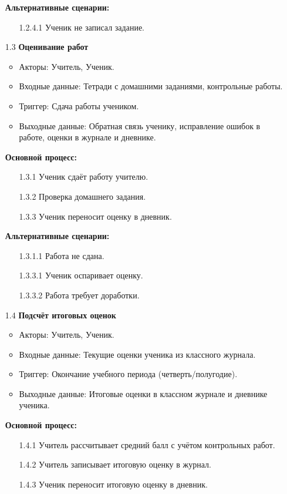 \documentclass[a4paper, final]{article}
\begin{document}
\begin{enumerate}
  \textbf{Альтернативные сценарии:}
  \begin{itemize}
    \item[1.2.4.1] Ученик не записал задание.
  \end{itemize}

  \item[1.3] \textbf{Оценивание работ}
  \begin{itemize}
    \item Акторы: Учитель, Ученик.
    \item Входные данные: Тетради с домашними заданиями, контрольные работы.
    \item Триггер: Сдача работы учеником.
    \item Выходные данные: Обратная связь ученику, исправление ошибок в работе, оценки в журнале и дневнике.
  \end{itemize}

  \textbf{Основной процесс:}
  \begin{enumerate}
    \item[1.3.1] Ученик сдаёт работу учителю.
    \item[1.3.2] Проверка домашнего задания.
    \item[1.3.3] Ученик переносит оценку в дневник.
  \end{enumerate}

  \textbf{Альтернативные сценарии:}
  \begin{itemize}
    \item[1.3.1.1] Работа не сдана.
    \item[1.3.3.1] Ученик оспаривает оценку.
    \item[1.3.3.2] Работа требует доработки. 
  \end{itemize}

  \item[1.4] \textbf{Подсчёт итоговых оценок}
  \begin{itemize}
    \item Акторы: Учитель, Ученик.
    \item Входные данные: Текущие оценки ученика из классного журнала.
    \item Триггер: Окончание учебного периода (четверть/полугодие).
    \item Выходные данные: Итоговые оценки в классном журнале и дневнике ученика.
  \end{itemize}

  \textbf{Основной процесс:}
  \begin{enumerate}
    \item[1.4.1] Учитель рассчитывает средний балл с учётом контрольных работ.
    \item[1.4.2] Учитель записывает итоговую оценку в журнал.
    \item[1.4.3] Ученик переносит итоговую оценку в дневник.
  \end{enumerate}


\end{enumerate}
\end{document}
